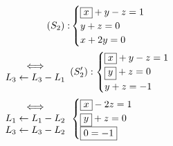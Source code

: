 \begin{exm}
	\begin{align*}
		(S_2): &\begin{cases}
			\boxed{x} + y - z = 1\\
			y + z = 0\\
			x + 2y = 0
		\end{cases}\\
		\begin{array}{c}
			\iff\\
			L_3 \leftarrow L_3 - L_1
		\end{array}&
		(S_2'): \begin{cases}
			\boxed{x} + y - z = 1\\
			\boxed{y} + z = 0\\
			y + z = -1
		\end{cases}\\
		\begin{array}{c}
			\iff\\
			L_1 \leftarrow L_1 - L_2\\
			L_3 \leftarrow L_3 - L_2
		\end{array}&
		\begin{cases}
			\boxed{x} - 2z = 1\\
			\boxed{y} + z = 0\\
			\boxed{0 = -1}
		\end{cases}
	\end{align*}
\end{exm}

